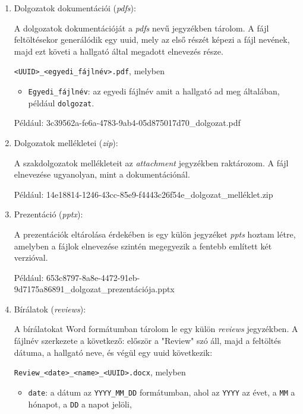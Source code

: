 \begin{enumerate}

\item{Dolgozatok dokumentációi (\textit{pdfs}):}

A dolgozatok dokumentációját a \textit{pdfs} nevű jegyzékben tárolom. 
A fájl feltöltésekor generálódik egy uuid, mely az első részét képezi a fájl nevének, majd ezt követi a hallgató által megadott elnevezés része.

\texttt{<UUID>\_<egyedi\_fájlnév>.pdf}, melyben

\begin{itemize}

\item\texttt{Egyedi\_fájlnév}: az egyedi fájlnév amit a hallgató ad meg általában, például \texttt{dolgozat}.

\end{itemize}

Például: 3c39562a-fe6a-4783-9ab4-05d875017d70\_dolgozat.pdf


\item{Dolgozatok mellékletei (\textit{zip}):}

A szakdolgozatok mellékleteit az \textit{attachment} jegyzékben raktározom. A fájl elnevezése ugyanolyan, mint a dokumentációnál.

Például: 14e18814-1246-43cc-85e9-f4443c26f54e\_dolgozat\_melléklet.zip

\item{Prezentáció (\textit{pptx}):}

A prezentációk eltárolása érdekében is egy külön jegyzéket \textit{ppts} hoztam létre, amelyben a fájlok elnevezése szintén megegyezik a fentebb említett két verzióval.

Például: 653c8797-8a8e-4472-91eb-9d7175a86891\_dolgozat\_prezentációja.pptx

\item{Bírálatok (\textit{reviews}):}

A bírálatokat Word formátumban tárolom le egy külön \textit{reviews} jegyzékben. A fájlnév szerkezete a következő: először a "Review" szó áll, majd a feltöltés dátuma, a hallgató neve, és végül egy uuid következik:

\texttt{Review\_<date>\_<name>\_<UUID>.docx}, melyben

\begin{itemize}
\item \texttt{date}: a dátum az \texttt{YYYY\_MM\_DD} formátumban, ahol az \texttt{YYYY} az évet, a \texttt{MM} a hónapot, a \texttt{DD} a napot jelöli,


\end{itemize}
\end{enumerate}
